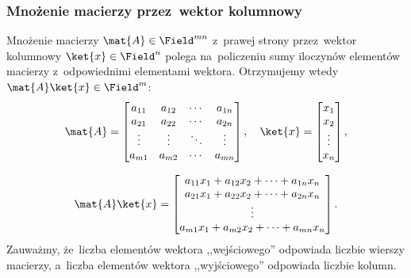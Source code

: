 \subsubsection{Mnożenie macierzy przez~wektor kolumnowy}
Mnożenie macierzy $\mat{A}\in \Field^{mn}$ z~prawej strony przez~wektor
kolumnowy $\ket{x}\in \Field^{n}$ polega na~policzeniu sumy iloczynów elementów
macierzy z~odpowiednimi elementami wektora. Otrzymujemy wtedy $\mat{A}\ket{x}\in
	\Field^m$:
$$
	\mat{A} =
	\begin{bmatrix}
		a_{11} & a_{12} & \cdots & a_{1n} \\
		a_{21} & a_{22} & \cdots & a_{2n} \\
		\vdots & \vdots & \ddots & \vdots \\
		a_{m1} & a_{m2} & \cdots & a_{mn}
	\end{bmatrix}, \quad
	\ket{x}=
	\begin{bmatrix}
		x_1    \\
		x_2    \\
		\vdots \\
		x_{n}  \\
	\end{bmatrix},
$$

$$
	\mat{A} \ket{x}=
	\begin{bmatrix}
		a_{11}x_1 + a_{12}x_2 + \dots + a_{1n}x_n \\
		a_{21}x_1 + a_{22}x_2 + \dots + a_{2n}x_n \\
		\vdots                                    \\
		a_{m1}x_1 + a_{m2}x_2 + \cdots + a_{mn}x_n
	\end{bmatrix}.
$$
Zauważmy, że~liczba elementów wektora ,,wejściowego'' odpowiada liczbie wierszy
macierzy, a~liczba elementów wektora ,,wyjściowego'' odpowiada liczbie kolumn.

